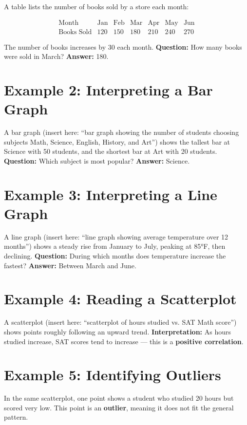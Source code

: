 \documentclass[12pt]{article}
\begin{document}
A table lists the number of books sold by a store each month:

\[
\begin{array}{c|cccccc}
\text{Month} & \text{Jan} & \text{Feb} & \text{Mar} & \text{Apr} & \text{May} & \text{Jun}\\ \hline
\text{Books Sold} & 120 & 150 & 180 & 210 & 240 & 270
\end{array}
\]

The number of books increases by 30 each month.  
\textbf{Question:} How many books were sold in March?  
\textbf{Answer:} 180.

\section*{Example 2: Interpreting a Bar Graph}

A bar graph (insert here: “bar graph showing the number of students choosing subjects Math, Science, English, History, and Art”)  
shows the tallest bar at Science with 50 students, and the shortest bar at Art with 20 students.  
\textbf{Question:} Which subject is most popular?  
\textbf{Answer:} Science.

\section*{Example 3: Interpreting a Line Graph}

A line graph (insert here: “line graph showing average temperature over 12 months”)  
shows a steady rise from January to July, peaking at 85°F, then declining.  
\textbf{Question:} During which months does temperature increase the fastest?  
\textbf{Answer:} Between March and June.

\section*{Example 4: Reading a Scatterplot}

A scatterplot (insert here: “scatterplot of hours studied vs. SAT Math score”)  
shows points roughly following an upward trend.  
\textbf{Interpretation:} As hours studied increase, SAT scores tend to increase — this is a \textbf{positive correlation}.

\section*{Example 5: Identifying Outliers}

In the same scatterplot, one point shows a student who studied 20 hours but scored very low.  
This point is an \textbf{outlier}, meaning it does not fit the general pattern.
\end{document}

